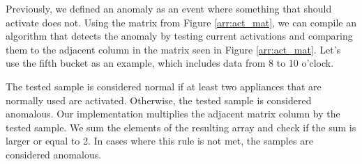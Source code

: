 Previously, we defined an anomaly as an event where something that should activate does not.
Using the matrix from Figure \ref{arr:act_mat}, we can compile an algorithm that detects the anomaly by testing current activations
and comparing them to the adjacent column in the matrix seen in Figure \ref{arr:act_mat}.
Let's use the fifth bucket as an example, which includes data from 8 to 10 o'clock.

The tested sample is considered normal if at least two appliances that are normally used are activated.
Otherwise, the tested sample is considered anomalous.
Our implementation multiplies the adjacent matrix column by the tested sample.
We sum the elements of the resulting array and check if the sum is larger or equal to 2.
In cases where this rule is not met, the samples are considered anomalous.

